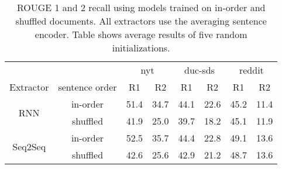 \begin{table*}
\center
\begin{tabular}{| c | c || c | c | c | c | c | c |}
\hline
  &   & \multicolumn{2}{|c|}{nyt} & \multicolumn{2}{|c|}{duc-sds} & \multicolumn{2}{|c|}{reddit} \\
Extractor & sentence order & R1 & R2  & R1 & R2  & R1 & R2 \\ 
\hline
\multirow{2}{*}{RNN} & in-order & 51.4 & 34.7 & 44.1 & 22.6 & 45.2 & 11.4\\ \cline{2-8}
 & shuffled & 41.9 & 25.0 & 39.7 & 18.2 & 45.1 & 11.9\\
\hline
\multirow{2}{*}{Seq2Seq} & in-order & 52.5 & 35.7 & 44.4 & 22.8 & 49.1 & 13.6\\ \cline{2-8}
 & shuffled & 42.6 & 25.6 & 42.9 & 21.2 & 48.7 & 13.6\\
\hline
\end{tabular}
\caption{ROUGE 1 and 2 recall using models trained on in-order and shuffled
documents. All extractors use the averaging sentence encoder. 
Table shows average results of five random initializations.}
\label{tab:shuffle}
\end{table*}
